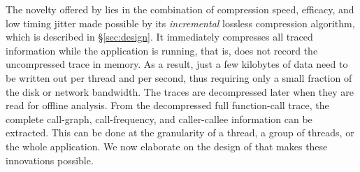 The novelty offered by \parlot lies in the combination of compression
speed, efficacy, and low timing jitter
made possible by its {\em incremental}
lossless compression algorithm, which is
described in \S\ref{sec:design}.
%
It immediately compresses all traced information while the application is running, that is, \parlot does not record the uncompressed trace in memory. 
%
As a result, just a few kilobytes of data need to be written out per thread and per second, thus requiring only a small fraction of the  disk or network bandwidth. 
%
The traces are decompressed later when they are read for offline analysis.
%
From the decompressed full function-call trace, the complete call-graph, 
call-frequency, and caller-callee information can be extracted. 
%
This can be done at the granularity of a thread, a group of threads, or the whole application.
%
We now elaborate on the design of \parlot that makes
these innovations possible.







